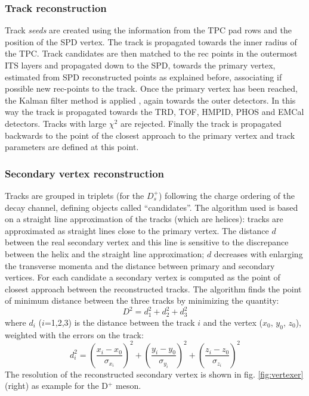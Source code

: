 \subsubsection{Track reconstruction}
Track \textit{seeds} are created using the information from the TPC pad rows and the position of the SPD vertex. The track is propagated towards the inner radius of the TPC. Track candidates are then matched to the rec points in the outermost ITS layers and propagated down to the SPD, towards the primary vertex, estimated from SPD reconstructed points as
explained before, associating if possible new rec-points to the track. Once the primary vertex has been reached, the Kalman filter method is applied \cite{kalman}, again towards the outer detectors. In this way the track is propagated towards the TRD, TOF, HMPID, PHOS and EMCal detectors. Tracks with large $\chi^2$ are rejected. Finally the track is propagated backwards to the point of the closest approach to the primary vertex and track parameters are defined at this point.

\subsubsection{Secondary vertex reconstruction}
Tracks are grouped in triplets (for the $D^+_s$) following the charge ordering of the decay channel, defining objects called ``candidates''. The algorithm used is based on a straight line approximation of the tracks (which are helices): tracks are approximated as straight lines close to the primary vertex. The distance $d$ between the real secondary vertex and this line is sensitive to the discrepance between the helix and the straight line approximation; $d$ decreases with enlarging the transverse momenta and the distance between primary and secondary vertices. For each candidate a secondary vertex is computed as the point of closest approach between the reconstructed tracks. The algorithm finds the point of minimum distance between the three tracks by minimizing the quantity:
\begin{equation}
D^2=d^2_1+d^2_2+d^2_3
\end{equation}
where $d_i$ ($i$=1,2,3) is the distance between the track $i$ and the vertex ($x_0$, $y_0$, $z_0$), weighted with the errors on the track:
\begin{equation}
d^2_i=\left(\frac{x_i-x_0}{\sigma_{x_i}}\right)^2+
\left(\frac{y_i-y_0}{\sigma_{y_i}}\right)^2+\left(\frac{z_i-z_0}{\sigma_{z_i}}\right)^2\end{equation}
The resolution of the reconstructed secondary vertex is shown in fig. \ref{fig:vertexer} (right) as example for  the D$^+$ meson.
\fi